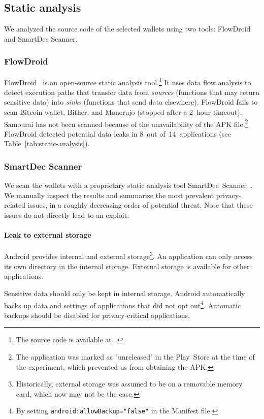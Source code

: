 \subsection{Static analysis}

We analyzed the source code of the selected wallets using two tools: FlowDroid and SmartDec Scanner.

\subsubsection*{FlowDroid}

FlowDroid~\cite{Arzt2014} is an open-source static analysis tool.\footnote{The source code is available at~\cite{FlowDroid}.}
It uses data flow analysis to detect execution paths that transfer data from \textit{sources} (functions that may return sensitive data) into \textit{sinks} (functions that send data elsewhere).
FlowDroid fails to scan Bitcoin wallet, Bither, and Monerujo (stopped after a 2~hour timeout).
Samourai has not been scanned because of the unavailability of the APK file.\footnote{The application was marked as "unreleased" in the Play~Store at the time of the experiment, which prevented us from obtaining the APK.}
FlowDroid detected potential data leaks in $8$~out of~$14$~applications (see Table~\ref{tab:static-analysis}).

\subsubsection*{SmartDec Scanner}
We scan the wallets with a proprietary static analysis tool SmartDec~Scanner~\cite{SmartDec2018}.
We manually inspect the results and summarize the most prevalent privacy-related issues, in a roughly decreasing order of potential threat.
Note that these issues do not directly lead to an exploit.

\paragraph{Leak to external storage}
Android provides internal and external storage\footnote{Historically, external storage was assumed to be on a removable memory card, which now may not be the case.}.
An application can only access its own directory in the internal storage.
External storage is available for other applications.

Sensitive data should only be kept in internal storage.
Android automatically backs up data and settings of applications that did not opt out\footnote{By setting \texttt{android:allowBackup="false"} in the Manifest file.}.
Automatic backups should be disabled for privacy-critical applications.

